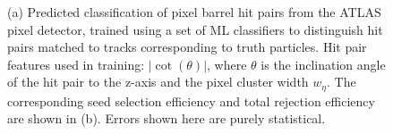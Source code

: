 \begin{figure}[htbp!] 
    \centering
    \hfill%
    \caption{(a) Predicted classification of pixel barrel hit pairs from the ATLAS pixel detector, trained using a set of ML classifiers to distinguish hit pairs matched to tracks corresponding to truth particles. Hit pair features used in training: $\lvert \cot(\theta) \rvert$, where $\theta$ is the inclination angle of the hit pair to the z-axis and the pixel cluster width $w_{\eta}$. The corresponding seed selection efficiency and total rejection efficiency are shown in (b). Errors shown here are purely statistical.}
\end{figure}





